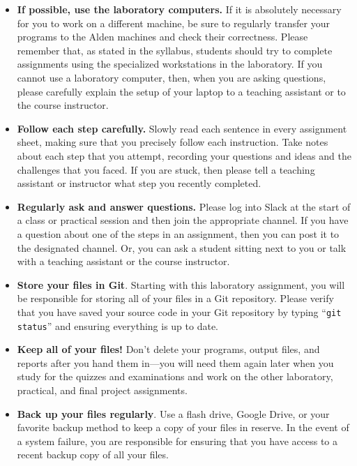 \vspace*{-.1in}
\begin{itemize}
  \setlength{\itemsep}{-.01in}

\item {\bf If possible, use the laboratory computers.} If it is absolutely necessary for you to work on a different
  machine, be sure to regularly transfer your programs to the Alden machines and check their correctness. Please
  remember that, as stated in the syllabus, students should try to complete assignments using the specialized
  workstations in the laboratory. If you cannot use a laboratory computer, then, when you are asking questions, please
  carefully explain the setup of your laptop to a teaching assistant or to the course instructor.

\item {\bf Follow each step carefully.} Slowly read each sentence in every assignment sheet, making sure that you
  precisely follow each instruction. Take notes about each step that you attempt, recording your questions and ideas
  and the challenges that you faced. If you are stuck, then please tell a teaching assistant or instructor what step
  you recently completed.

\item {\bf Regularly ask and answer questions.} Please log into Slack at the start of a class or practical session and
  then join the appropriate channel. If you have a question about one of the steps in an assignment, then you can post
  it to the designated channel. Or, you can ask a student sitting next to you or talk with a teaching assistant or the
  course instructor.

\item {\bf Store your files in Git}. Starting with this laboratory assignment, you will be responsible for storing all
  of your files in a Git repository. Please verify that you have saved your source code in your Git repository by
  typing ``{\tt git status}'' and ensuring everything is up to date.

\item {\bf Keep all of your files!} Don't delete your programs, output files, and reports after you hand them in---you
  will need them again later when you study for the quizzes and examinations and work on the other laboratory,
  practical, and final project assignments.

\item {\bf Back up your files regularly}. Use a flash drive, Google Drive, or your favorite backup method to keep a
  copy of your files in reserve. In the event of a system failure, you are responsible for ensuring that you have
  access to a recent backup copy of all your files.

\end{itemize}

